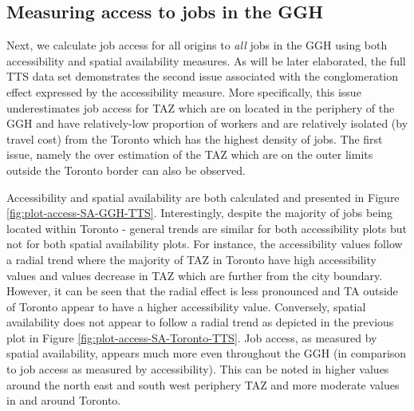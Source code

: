 \documentclass[]{elsarticle} %
\begin{document}
\newpage

\hypertarget{measuring-access-to-jobs-in-the-ggh}{%
\subsection{Measuring access to jobs in the
GGH}\label{measuring-access-to-jobs-in-the-ggh}}

Next, we calculate job access for all origins to \emph{all} jobs in the
GGH using both accessibility and spatial availability measures. As will
be later elaborated, the full TTS data set demonstrates the second issue
associated with the conglomeration effect expressed by the accessibility
measure. More specifically, this issue underestimates job access for TAZ
which are on located in the periphery of the GGH and have relatively-low
proportion of workers and are relatively isolated (by travel cost) from
the Toronto which has the highest density of jobs. The first issue,
namely the over estimation of the TAZ which are on the outer limits
outside the Toronto border can also be observed.

Accessibility and spatial availability are both calculated and presented
in Figure \ref{fig:plot-access-SA-GGH-TTS}. Interestingly, despite the
majority of jobs being located within Toronto - general trends are
similar for both accessibility plots but not for both spatial
availability plots. For instance, the accessibility values follow a
radial trend where the majority of TAZ in Toronto have high
accessibility values and values decrease in TAZ which are further from
the city boundary. However, it can be seen that the radial effect is
less pronounced and TA outside of Toronto appear to have a higher
accessibility value. Conversely, spatial availability does not appear to
follow a radial trend as depicted in the previous plot in Figure
\ref{fig:plot-access-SA-Toronto-TTS}. Job access, as measured by spatial
availability, appears much more even throughout the GGH (in comparison
to job access as measured by accessibility). This can be noted in higher
values around the north east and south west periphery TAZ and more
moderate values in and around Toronto.
\end{document}
